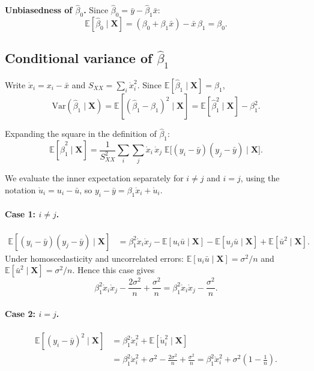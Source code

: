 \documentclass[a4paper,oneside,12pt]{extarticle}
\theoremstyle{plain}
\theoremstyle{definition}
\theoremstyle{remark}
\newcommand*{\E}{\mathbb{E}}
\newcommand*{\Var}{\mathrm{Var}}
\begin{document}
\textbf{Unbiasedness of $\hat\beta_0$.}
Since $\hat\beta_0 = \bar y - \hat\beta_1 \bar x$:
\[
  \E[\hat\beta_0 \mid \mathbf{X}]
  = (\beta_0 + \beta_1\bar x) - \bar x\,\beta_1 = \beta_0.
\]

\subsection{Conditional variance of \texorpdfstring{$\hat\beta_1$}{beta-hat\_1}}

Write $\mathring{x}_i = x_i - \bar x$ and $S_{XX} = \sum_i \mathring{x}_i^2$.
Since $\E[\hat\beta_1 \mid \mathbf{X}] = \beta_1$,
\[
  \Var(\hat\beta_1 \mid \mathbf{X})
  = \E\!\left[(\hat\beta_1 - \beta_1)^2 \mid \mathbf{X}\right]
  = \E\!\left[\hat\beta_1^2 \mid \mathbf{X}\right] - \beta_1^2.
\]

Expanding the square in the definition of $\hat\beta_1$:
\[
  \E[\hat\beta_1^2 \mid \mathbf{X}]
  = \frac{1}{S_{XX}^2}
    \sum_i\sum_j \mathring{x}_i\,\mathring{x}_j\;
    \E\!\bigl[(y_i-\bar y)(y_j-\bar y)\mid\mathbf{X}\bigr].
\]

We evaluate the inner expectation separately for $i \neq j$ and $i = j$,
using the notation $\mathring{u}_i = u_i - \bar u$, so
$y_i - \bar y = \beta_1\mathring{x}_i + \mathring{u}_i$.

\paragraph{Case 1: $i \neq j$.}
\begin{align*}
  \E[(y_i-\bar y)(y_j-\bar y)\mid\mathbf{X}]
  &= \beta_1^2\mathring{x}_i\mathring{x}_j
     - \E[u_i\bar u\mid\mathbf{X}]
     - \E[u_j\bar u\mid\mathbf{X}]
     + \E[\bar u^2\mid\mathbf{X}].
\end{align*}
Under homoscedasticity and uncorrelated errors:
$\E[u_i\bar u\mid\mathbf{X}] = \sigma^2/n$ and $\E[\bar u^2\mid\mathbf{X}] = \sigma^2/n$.
Hence this case gives
\[
  \beta_1^2\mathring{x}_i\mathring{x}_j - \frac{2\sigma^2}{n} + \frac{\sigma^2}{n}
  = \beta_1^2\mathring{x}_i\mathring{x}_j - \frac{\sigma^2}{n}.
\]

\paragraph{Case 2: $i = j$.}
\begin{align*}
  \E[(y_i-\bar y)^2\mid\mathbf{X}]
  &= \beta_1^2\mathring{x}_i^2 + \E[\mathring{u}_i^2\mid\mathbf{X}] \\
  &= \beta_1^2\mathring{x}_i^2
     + \sigma^2 - \frac{2\sigma^2}{n} + \frac{\sigma^2}{n}
   = \beta_1^2\mathring{x}_i^2 + \sigma^2\!\left(1-\tfrac{1}{n}\right).
\end{align*}
\end{document}
